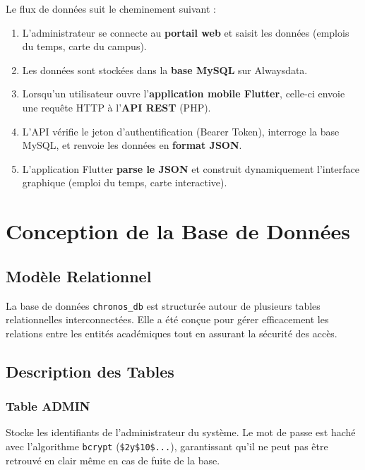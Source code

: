 \documentclass[12pt, a4paper]{report}
\begin{document}
Le flux de données suit le cheminement suivant :

\begin{enumerate}
    \item L'administrateur se connecte au \textbf{portail web} et saisit les données (emplois du temps, carte du campus).
    \item Les données sont stockées dans la \textbf{base MySQL} sur Alwaysdata.
    \item Lorsqu'un utilisateur ouvre l'\textbf{application mobile Flutter}, celle-ci envoie une requête HTTP à l'\textbf{API REST} (PHP).
    \item L'API vérifie le jeton d'authentification (Bearer Token), interroge la base MySQL, et renvoie les données en \textbf{format JSON}.
    \item L'application Flutter \textbf{parse le JSON} et construit dynamiquement l'interface graphique (emploi du temps, carte interactive).
\end{enumerate}


\chapter{Conception de la Base de Données}

\section{Modèle Relationnel}

La base de données \texttt{chronos\_db} est structurée autour de plusieurs tables relationnelles interconnectées. Elle a été conçue pour gérer efficacement les relations entre les entités académiques tout en assurant la sécurité des accès.

\section{Description des Tables}

\subsection{Table ADMIN}
Stocke les identifiants de l'administrateur du système. Le mot de passe est haché avec l'algorithme \texttt{bcrypt} (\texttt{\$2y\$10\$...}), garantissant qu'il ne peut pas être retrouvé en clair même en cas de fuite de la base.
\end{document}
